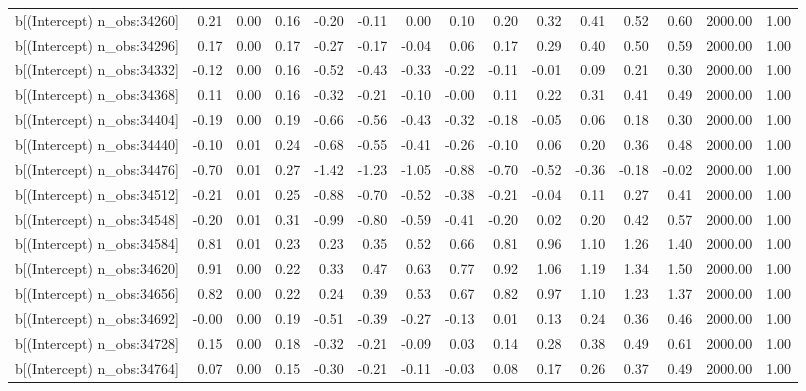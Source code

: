 \begin{table}[ht]
\begin{tabular}{rrrrrrrrrrrrrrr}
  b[(Intercept) n\_obs:34260] & 0.21 & 0.00 & 0.16 & -0.20 & -0.11 & 0.00 & 0.10 & 0.20 & 0.32 & 0.41 & 0.52 & 0.60 & 2000.00 & 1.00 \\ 
  b[(Intercept) n\_obs:34296] & 0.17 & 0.00 & 0.17 & -0.27 & -0.17 & -0.04 & 0.06 & 0.17 & 0.29 & 0.40 & 0.50 & 0.59 & 2000.00 & 1.00 \\ 
  b[(Intercept) n\_obs:34332] & -0.12 & 0.00 & 0.16 & -0.52 & -0.43 & -0.33 & -0.22 & -0.11 & -0.01 & 0.09 & 0.21 & 0.30 & 2000.00 & 1.00 \\ 
  b[(Intercept) n\_obs:34368] & 0.11 & 0.00 & 0.16 & -0.32 & -0.21 & -0.10 & -0.00 & 0.11 & 0.22 & 0.31 & 0.41 & 0.49 & 2000.00 & 1.00 \\ 
  b[(Intercept) n\_obs:34404] & -0.19 & 0.00 & 0.19 & -0.66 & -0.56 & -0.43 & -0.32 & -0.18 & -0.05 & 0.06 & 0.18 & 0.30 & 2000.00 & 1.00 \\ 
  b[(Intercept) n\_obs:34440] & -0.10 & 0.01 & 0.24 & -0.68 & -0.55 & -0.41 & -0.26 & -0.10 & 0.06 & 0.20 & 0.36 & 0.48 & 2000.00 & 1.00 \\ 
  b[(Intercept) n\_obs:34476] & -0.70 & 0.01 & 0.27 & -1.42 & -1.23 & -1.05 & -0.88 & -0.70 & -0.52 & -0.36 & -0.18 & -0.02 & 2000.00 & 1.00 \\ 
  b[(Intercept) n\_obs:34512] & -0.21 & 0.01 & 0.25 & -0.88 & -0.70 & -0.52 & -0.38 & -0.21 & -0.04 & 0.11 & 0.27 & 0.41 & 2000.00 & 1.00 \\ 
  b[(Intercept) n\_obs:34548] & -0.20 & 0.01 & 0.31 & -0.99 & -0.80 & -0.59 & -0.41 & -0.20 & 0.02 & 0.20 & 0.42 & 0.57 & 2000.00 & 1.00 \\ 
  b[(Intercept) n\_obs:34584] & 0.81 & 0.01 & 0.23 & 0.23 & 0.35 & 0.52 & 0.66 & 0.81 & 0.96 & 1.10 & 1.26 & 1.40 & 2000.00 & 1.00 \\ 
  b[(Intercept) n\_obs:34620] & 0.91 & 0.00 & 0.22 & 0.33 & 0.47 & 0.63 & 0.77 & 0.92 & 1.06 & 1.19 & 1.34 & 1.50 & 2000.00 & 1.00 \\ 
  b[(Intercept) n\_obs:34656] & 0.82 & 0.00 & 0.22 & 0.24 & 0.39 & 0.53 & 0.67 & 0.82 & 0.97 & 1.10 & 1.23 & 1.37 & 2000.00 & 1.00 \\ 
  b[(Intercept) n\_obs:34692] & -0.00 & 0.00 & 0.19 & -0.51 & -0.39 & -0.27 & -0.13 & 0.01 & 0.13 & 0.24 & 0.36 & 0.46 & 2000.00 & 1.00 \\ 
  b[(Intercept) n\_obs:34728] & 0.15 & 0.00 & 0.18 & -0.32 & -0.21 & -0.09 & 0.03 & 0.14 & 0.28 & 0.38 & 0.49 & 0.61 & 2000.00 & 1.00 \\ 
  b[(Intercept) n\_obs:34764] & 0.07 & 0.00 & 0.15 & -0.30 & -0.21 & -0.11 & -0.03 & 0.08 & 0.17 & 0.26 & 0.37 & 0.49 & 2000.00 & 1.00 \\ 

\end{tabular}
\end{table}
